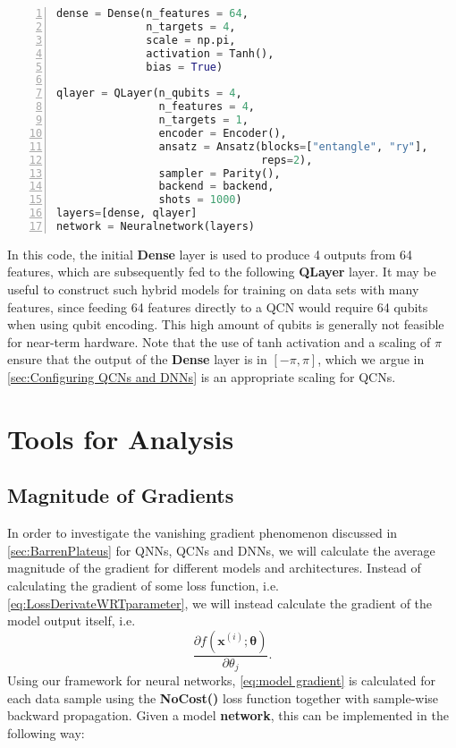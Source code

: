 \begin{lstlisting}[language=python, numbers=left]
dense = Dense(n_features = 64,
              n_targets = 4,
              scale = np.pi,
              activation = Tanh(),
              bias = True)
              
qlayer = QLayer(n_qubits = 4,
                n_features = 4,
                n_targets = 1,
                encoder = Encoder(),
                ansatz = Ansatz(blocks=["entangle", "ry"],
                                reps=2),
                sampler = Parity(),
                backend = backend,
                shots = 1000)
layers=[dense, qlayer]       
network = Neuralnetwork(layers)
\end{lstlisting}
In this code, the initial \textbf{Dense} layer is used to produce 4 outputs from 64 features, which are subsequently fed to the following \textbf{QLayer} layer. It may be useful to construct such hybrid models for training on data sets with many features, since feeding 64 features directly to a QCN would require 64 qubits when using qubit encoding. This high amount of qubits is generally not feasible for near-term hardware. Note that the use of tanh activation and a scaling of $\pi$ ensure that the output of the \textbf{Dense} layer is in $[-\pi, \pi]$, which we argue in \autoref{sec:Configuring QCNs and DNNs} is an appropriate scaling for QCNs.


\section{Tools for Analysis}\label{sec:Tools for Analysis Imp}

\subsection{Magnitude of Gradients}\label{sec:Magnitude of Gradients}
In order to investigate the vanishing gradient phenomenon discussed in \autoref{sec:BarrenPlateus} for QNNs, QCNs and DNNs, we will calculate the average magnitude of the gradient for different models and architectures. Instead of calculating the gradient of some loss function, i.e. \autoref{eq:LossDerivateWRTparameter}, we will instead calculate the gradient of the model output itself, i.e.
\begin{equation}\label{eq:model gradient}
    \frac{\partial f(\boldsymbol{x}^{(i)};\boldsymbol{\theta})}{\partial \theta_j}.
\end{equation}
Using our framework for neural networks, \autoref{eq:model gradient} is calculated for each data sample using the \textbf{NoCost()} loss function together with sample-wise backward propagation. Given a model \textbf{network}, this can be implemented in the following way:

